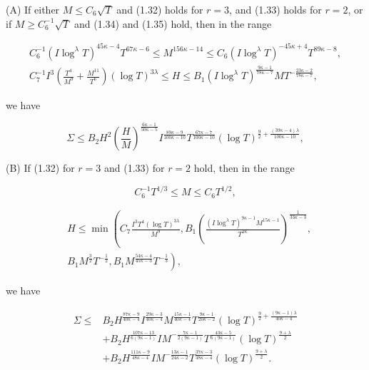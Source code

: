 \documentclass[10pt]{article}
\begin{document}
(A) If either $M \leqslant C_{6} \sqrt{T}$ and (1.32) holds for $r=3$, and (1.33) holds for $r=2$, or if $M \geqslant C_{6}^{-1} \sqrt{T}$ and (1.34) and (1.35) hold, then in the range


\begin{gather*}
C_{6}^{-1}\left(I \log ^{\lambda} T\right)^{45 \kappa-4} T^{67 \kappa-6} \leqslant M^{156 \kappa-14} \leqslant C_{6}\left(I \log ^{\lambda} T\right)^{-45 \kappa+4} T^{89 \kappa-8},  \tag{1.36}\\
C_{7}^{-1} I^{3}\left(\frac{T^{4}}{M^{9}}+\frac{M^{11}}{T^{6}}\right)(\log T)^{3 \lambda} \leqslant H \leqslant B_{1}\left(I \log ^{\lambda} T\right)^{\frac{9 \kappa-1}{78 \kappa-7}} M T^{-\frac{23 \kappa-2}{78 \kappa-7}}, \tag{1.37}
\end{gather*}


we have


\begin{equation*}
\Sigma \leqslant B_{2} H^{2}\left(\frac{H}{M}\right)^{\frac{6 \kappa-1}{50 \kappa-5}} I^{\frac{89 \kappa-9}{100 \kappa-10}} T^{\frac{67 \kappa-7}{100 \kappa-10}}(\log T)^{\frac{9}{2}+\frac{(39 \kappa-4) \lambda}{100 \kappa-10}}, \tag{1.38}
\end{equation*}


(B) If (1.32) for $r=3$ and (1.33) for $r=2$ hold, then in the range


\begin{equation*}
C_{6}^{-1} T^{1 / 3} \leqslant M \leqslant C_{6} T^{1 / 2}, \tag{1.39}
\end{equation*}



\begin{align*}
& H \leqslant \min \left(C_{7} \frac{I^{3} T^{4}(\log T)^{3 \lambda}}{M^{9}}, B_{1}\left(\frac{\left(I \log ^{\lambda} T\right)^{9 \kappa-1} M^{15 \kappa-1}}{T^{2 \kappa}}\right)^{\frac{1}{33 \kappa-3}},\right. \\
&\left.B_{1} M^{\frac{3}{2}} T^{-\frac{1}{2}}, B_{1} M^{\frac{54 \kappa-4}{45 \kappa-3}} T^{-\frac{1}{3}}\right), \tag{1.40}
\end{align*}


we have


\begin{align*}
\Sigma \leqslant & B_{2} H^{\frac{87 \kappa-9}{40 \kappa-4}} I^{\frac{29 \kappa-3}{40 \kappa-4}} M^{\frac{15 \kappa-1}{40 \kappa-4}} T^{\frac{9 \kappa-1}{20 \kappa-2}}(\log T)^{\frac{9}{2}+\frac{(9 \kappa-1)\lambda}{40 \kappa-4}} \\
& +B_{2} H^{\frac{107 \kappa-13}{6(9 \kappa-1)}} I M^{-\frac{7 \kappa-1}{2(9 \kappa-1)}} T^{\frac{43 \kappa-5}{6(9 \kappa-1)}}(\log T)^{\frac{9+\lambda}{2}} \\
& +B_{2} H^{\frac{111 \kappa-9}{48 \kappa-4}} I M^{-\frac{13 \kappa-1}{24 \kappa-2}} T^{\frac{37 \kappa-3}{48 \kappa-4}}(\log T)^{\frac{9+\lambda}{2}}. \tag{1.41}
\end{align*}
\end{document}
